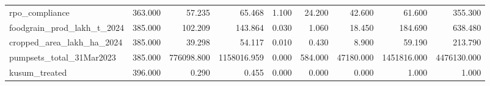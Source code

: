 \begin{tabular}{lrrrrrrrr}
rpo_compliance & 363.000 & 57.235 & 65.468 & 1.100 & 24.200 & 42.600 & 61.600 & 355.300 \\
foodgrain_prod_lakh_t_2024 & 385.000 & 102.209 & 143.864 & 0.030 & 1.060 & 18.450 & 184.690 & 638.480 \\
cropped_area_lakh_ha_2024 & 385.000 & 39.298 & 54.117 & 0.010 & 0.430 & 8.900 & 59.190 & 213.790 \\
pumpsets_total_31Mar2023 & 385.000 & 776098.800 & 1158016.959 & 0.000 & 584.000 & 47180.000 & 1451816.000 & 4476130.000 \\
kusum_treated & 396.000 & 0.290 & 0.455 & 0.000 & 0.000 & 0.000 & 1.000 & 1.000 \\
\bottomrule
\end{tabular}

